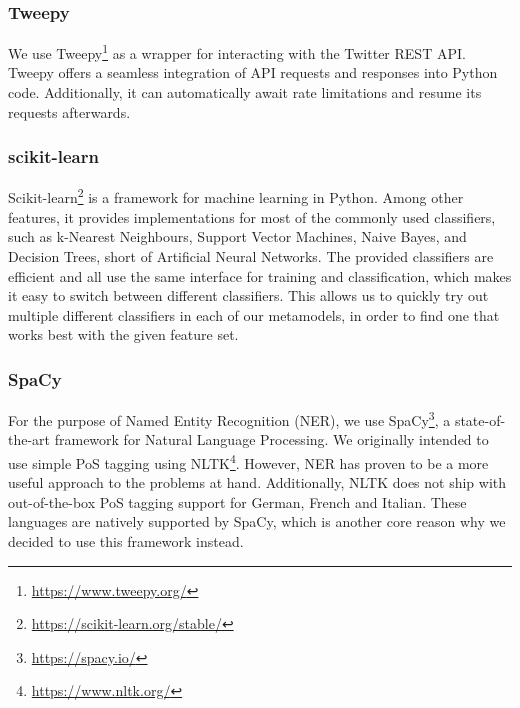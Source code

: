 \documentclass[10pt,a4paper]{article}
\begin{document}
\subsubsection{Tweepy}
We use Tweepy\footnote{\href{https://www.tweepy.org/}{https://www.tweepy.org/}} as a wrapper for interacting with the Twitter REST API. Tweepy offers a seamless integration of API requests and responses into Python code. Additionally, it can automatically await rate limitations and resume its requests afterwards. 

\subsubsection{scikit-learn}
Scikit-learn\footnote{\href{https://scikit-learn.org/stable/}{https://scikit-learn.org/stable/}} is a framework for machine learning in Python. Among other features, it provides implementations for most of the commonly used classifiers, such as k-Nearest Neighbours, Support Vector Machines, Naive Bayes, and Decision Trees, short of Artificial Neural Networks. The provided classifiers are efficient and all use the same interface for training and classification, which makes it easy to switch between different classifiers. This allows us to quickly try out multiple different classifiers in each of our metamodels, in order to find one that works best with the given feature set.

\subsubsection{SpaCy}
For the purpose of Named Entity Recognition (NER), we use SpaCy\footnote{\href{https://spacy.io/}{https://spacy.io/}}, a state-of-the-art framework for Natural Language Processing. We originally intended to use simple PoS tagging using NLTK\footnote{\href{https://www.nltk.org/}{https://www.nltk.org/}}. However, NER has proven to be a more useful approach to the problems at hand. Additionally, NLTK does not ship with out-of-the-box PoS tagging support for German, French and Italian. These languages are natively supported by SpaCy, which is another core reason why we decided to use this framework instead.
\end{document}
